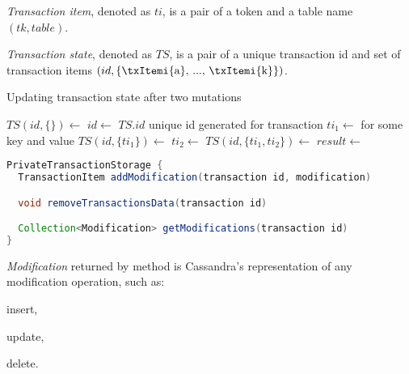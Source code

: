 \begin{definition}
  \label{def:transactionItem}
  \emph{Transaction item}, denoted as $ti$, is a pair of a token and a table name $(tk,table)$.
\end{definition}

\begin{definition}
  \label{def:transactionState}
  \emph{Transaction state}, denoted as $TS$, is a pair of a unique transaction id and set of transaction items $(id, \{ \text{\txItemi{a}, ..., \txItemi{k}} \})$.
\end{definition}



\begin{algorithm}
  \caption{Updating transaction state after two mutations}
  \label{alg:updateTxState}
  \begin{algorithmic}  	    
    \State $TS(id, \{ \}) \gets$ 
    \State $id \gets$ $TS.id$ unique id generated for transaction
    \State $ti_{1} \gets $  \Comment for some key and value
    \State $TS(id, \{ ti_{1} \}) \gets$ 
    \State $ti_{2} \gets $ 
    \State $TS(id, \{ ti_{1}, ti_{2} \}) \gets$  
    \State $result \gets $     
  \end{algorithmic}
\end{algorithm}


\begin{lstlisting}[language=Java,style=outcode,label={lst:privateTransactionStorage},caption={API of private transaction storage}]
PrivateTransactionStorage {
  TransactionItem addModification(transaction id, modification)

  void removeTransactionsData(transaction id)

  Collection<Modification> getModifications(transaction id)        
}

\end{lstlisting}

\emph{Modification} returned by  method is Cassandra's representation of any modification operation, such as: \begin{enumerate*} \item insert, \item update, \item delete. \end{enumerate*}

